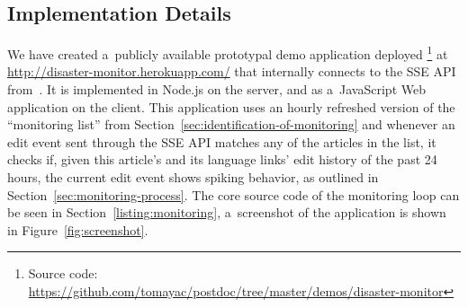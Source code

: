 \documentclass[letterpaper]{article}
\begin{document}
\subsection{Implementation Details}

We have created a~publicly available prototypal demo application
deployed%
\footnote{Source code:
\url{https://github.com/tomayac/postdoc/tree/master/demos/disaster-monitor}}
at \url{http://disaster-monitor.herokuapp.com/}
that internally connects to the SSE API from~\cite{steiner2014bots}.
It is implemented in Node.js on the server,
and as a~JavaScript Web application on the client.
This application uses an hourly refreshed version of the ``monitoring list''
from Section~\ref{sec:identification-of-monitoring}
and whenever an edit event sent through the SSE API
matches any of the articles in the list,
it checks if, given this article's and its language links'
edit history of the past 24 hours,
the current edit event shows spiking behavior,
as outlined in Section~\ref{sec:monitoring-process}.
The core source code of the monitoring loop
can be seen in Section~\ref{listing:monitoring},
a~screenshot of the application is shown in Figure~\ref{fig:screenshot}.
\end{document}
